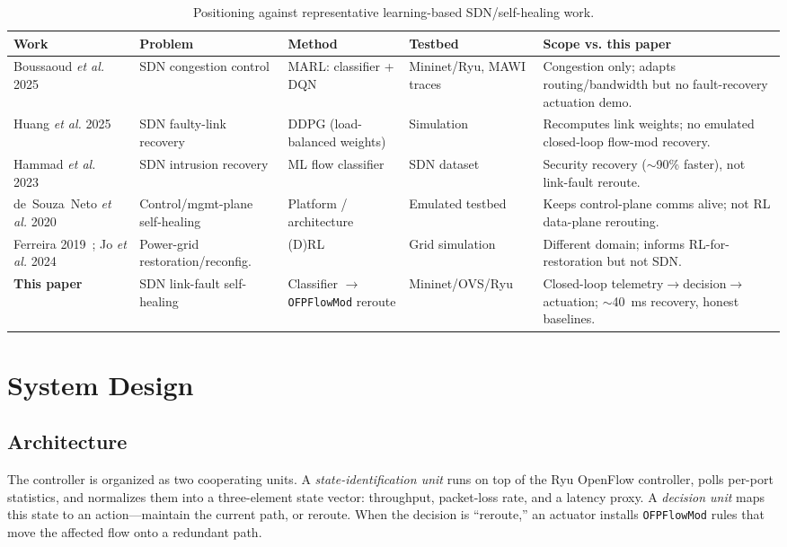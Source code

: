 \documentclass[conference]{IEEEtran}
\begin{document}
\begin{table}[t]
\centering
\footnotesize
\caption{Positioning against representative learning-based SDN/self-healing work.}
\label{tab:related}
\begin{tabular}{@{}p{2.0cm}p{2.7cm}p{2.6cm}p{2.4cm}p{4.2cm}@{}}
\toprule
\textbf{Work} & \textbf{Problem} & \textbf{Method} & \textbf{Testbed} & \textbf{Scope vs. this paper} \\
\midrule
Boussaoud \emph{et al.} 2025~\cite{boussaoud2025} & SDN congestion control & MARL: classifier + DQN & Mininet/Ryu, MAWI traces & Congestion only; adapts routing/bandwidth but no fault-recovery actuation demo. \\
Huang \emph{et al.} 2025~\cite{huang2025} & SDN faulty-link recovery & DDPG (load-balanced weights) & Simulation & Recomputes link weights; no emulated closed-loop flow-mod recovery. \\
Hammad \emph{et al.} 2023~\cite{hammad2023} & SDN intrusion recovery & ML flow classifier & SDN dataset & Security recovery ($\sim$90\% faster), not link-fault reroute. \\
de~Souza~Neto \emph{et al.} 2020~\cite{neto2020} & Control/mgmt-plane self-healing & Platform / architecture & Emulated testbed & Keeps control-plane comms alive; not RL data-plane rerouting. \\
Ferreira 2019~\cite{ferreira2019}; Jo \emph{et al.} 2024~\cite{jo2024} & Power-grid restoration/reconfig. & (D)RL & Grid simulation & Different domain; informs RL-for-restoration but not SDN. \\
\textbf{This paper} & SDN link-fault self-healing & Classifier $\rightarrow$ \texttt{OFPFlowMod} reroute & Mininet/OVS/Ryu & Closed-loop telemetry$\rightarrow$decision$\rightarrow$actuation; $\sim$40~ms recovery, honest baselines. \\
\bottomrule
\end{tabular}
\end{table}

\section{System Design}
\subsection{Architecture}
The controller is organized as two cooperating units. A \emph{state-identification
unit} runs on top of the Ryu OpenFlow controller, polls per-port statistics, and
normalizes them into a three-element state vector: throughput, packet-loss rate,
and a latency proxy. A \emph{decision unit} maps this state to an action---maintain
the current path, or reroute. When the decision is ``reroute,'' an actuator
installs \texttt{OFPFlowMod} rules that move the affected flow onto a redundant
path.
\end{document}
